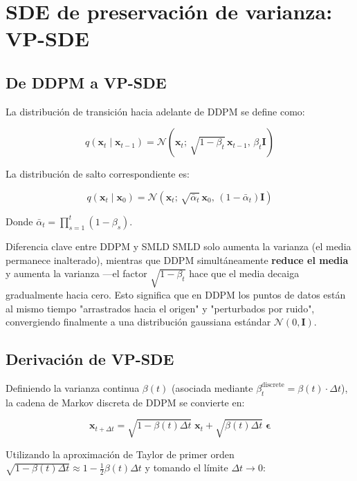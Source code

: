 \section{SDE de preservación de varianza: VP-SDE}

\subsection{De DDPM a VP-SDE}

La distribución de transición hacia adelante de DDPM se define como:

$$
q(\mathbf{x}_t \mid \mathbf{x}_{t-1}) = \mathcal{N}\!\left(\mathbf{x}_t;\, \sqrt{1-\beta_t}\,\mathbf{x}_{t-1},\, \beta_t \mathbf{I}\right)
$$

La distribución de salto correspondiente es:

$$
q(\mathbf{x}_t \mid \mathbf{x}_0) = \mathcal{N}\!\left(\mathbf{x}_t;\, \sqrt{\bar{\alpha}_t}\,\mathbf{x}_0,\, (1 - \bar{\alpha}_t)\mathbf{I}\right)
$$

Donde $\bar{\alpha}_t = \prod_{s=1}^{t}(1-\beta_s)$.

\begin{warningbox}{Diferencia clave entre DDPM y SMLD}
SMLD solo aumenta la varianza (el media permanece inalterado), mientras que DDPM simultáneamente \textbf{reduce el media} y aumenta la varianza —el factor $\sqrt{1-\beta_t}$ hace que el media decaiga gradualmente hacia cero. Esto significa que en DDPM los puntos de datos están al mismo tiempo "arrastrados hacia el origen" y "perturbados por ruido", convergiendo finalmente a una distribución gaussiana estándar $\mathcal{N}(0, \mathbf{I})$.
\end{warningbox}

\subsection{Derivación de VP-SDE}

Definiendo la varianza continua $\beta(t)$ (asociada mediante $\beta_t^{\text{discrete}} = \beta(t) \cdot \Delta t$), la cadena de Markov discreta de DDPM se convierte en:

$$
\mathbf{x}_{t+\Delta t} = \sqrt{1 - \beta(t)\Delta t}\;\mathbf{x}_t + \sqrt{\beta(t)\Delta t}\;\boldsymbol{\epsilon}
$$

Utilizando la aproximación de Taylor de primer orden $\sqrt{1 - \beta(t)\Delta t} \approx 1 - \frac{1}{2}\beta(t)\Delta t$ y tomando el límite $\Delta t \to 0$:

